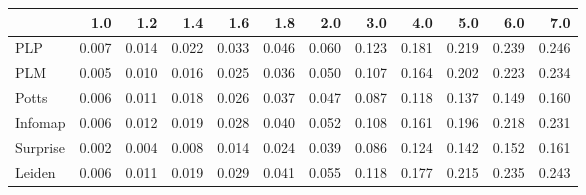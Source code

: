 \begin{tabular}{lrrrrrrrrrrr}
\toprule
{} &   1.0 &   1.2 &   1.4 &   1.6 &   1.8 &   2.0 &   3.0 &   4.0 &   5.0 &   6.0 &   7.0 \\
\midrule
PLP      & 0.007 & 0.014 & 0.022 & 0.033 & 0.046 & 0.060 & 0.123 & 0.181 & 0.219 & 0.239 & 0.246 \\
PLM      & 0.005 & 0.010 & 0.016 & 0.025 & 0.036 & 0.050 & 0.107 & 0.164 & 0.202 & 0.223 & 0.234 \\
Potts    & 0.006 & 0.011 & 0.018 & 0.026 & 0.037 & 0.047 & 0.087 & 0.118 & 0.137 & 0.149 & 0.160 \\
Infomap  & 0.006 & 0.012 & 0.019 & 0.028 & 0.040 & 0.052 & 0.108 & 0.161 & 0.196 & 0.218 & 0.231 \\
Surprise & 0.002 & 0.004 & 0.008 & 0.014 & 0.024 & 0.039 & 0.086 & 0.124 & 0.142 & 0.152 & 0.161 \\
Leiden   & 0.006 & 0.011 & 0.019 & 0.029 & 0.041 & 0.055 & 0.118 & 0.177 & 0.215 & 0.235 & 0.243 \\
\bottomrule
\end{tabular}
